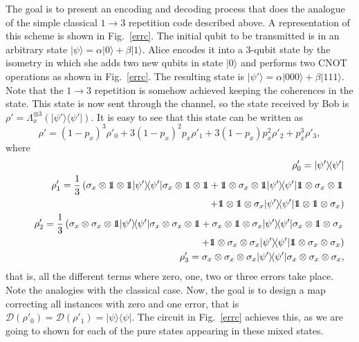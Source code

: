 \documentclass[a4paper]{article}
\def\sx{{\sigma_x}}
\def\one{\leavevmode\hbox{\small1\normalsize\kern-.33em1}}
\def\bra#1{\langle#1|} \def\ket#1{|#1\rangle}
\def\proj#1{\ket{#1}\!\bra{#1}}
\begin{document}
The goal is to present an encoding and decoding process that does the analogue of the simple classical $1\rightarrow 3$ repetition code described above.
A representation of this scheme is shown in Fig.~\ref{errc}. The initial qubit to be transmitted is in an arbitrary state $\ket\psi=\alpha\ket 0 +\beta\ket 1$. Alice encodes it into a 3-qubit state by the isometry in which she adds two new qubits in state $\ket 0$ and performs two CNOT operations as shown in Fig.~\ref{errc}. The resulting state is $\ket{\psi'}=\alpha\ket{000}+\beta\ket{111}$. Note that the $1\rightarrow 3$ repetition is somehow achieved keeping the coherences in the state. This state is now sent through the channel, so the state received by Bob is $\rho'=\Lambda_x^{\otimes 3}(\proj{\psi'})$. It is easy to see that this state can be written as
\begin{equation}
\rho'=(1-p_x)^3\rho'_0+3(1-p_x)^2p_x\rho'_1+3(1-p_x)p_x^2\rho'_2+p_x^3\rho'_3 ,
\end{equation}
where
\begin{eqnarray}
&&\rho'_0=\proj{\psi'}\nonumber\\
&&\rho'_1=\frac{1}{3}\left(\sx\otimes\one\otimes\one\proj{\psi'}\sx\otimes\one\otimes\one+\one\otimes\sx\otimes\one\proj{\psi'}\one\otimes\sx\otimes\one\right.\nonumber\\
&\quad&\left.\quad\quad+\one\otimes\one\otimes\sx \proj{\psi'} \one\otimes\one\otimes\sx\right) \nonumber\\
&&\rho'_2= \frac{1}{3}\left(\sx\otimes\sx\otimes\one \proj{\psi'} \sx\otimes\sx\otimes\one + \sx\otimes\one\otimes\sx \proj{\psi'} \sx\otimes\one\otimes\sx\right.\nonumber\\
&\quad&\left.\quad\quad+\one\otimes\sx\otimes\sx \proj{\psi'} \one\otimes\sx\otimes\sx\right) \nonumber\\
&&\rho'_3= \sx\otimes\sx\otimes\sx \proj{\psi'} \sx\otimes\sx\otimes\sx ,
\end{eqnarray}
that is, all the different terms where zero, one, two or three errors take place. Note the analogies with the classical case. Now, the goal is to design a map correcting all instances with zero and one error, that is $\mathcal D(\rho'_0)=\mathcal D(\rho'_1)=\proj\psi$. The circuit in Fig.~\ref{errc} achieves this, as we are going to shown for each of the pure states appearing in these mixed states.
\end{document}
